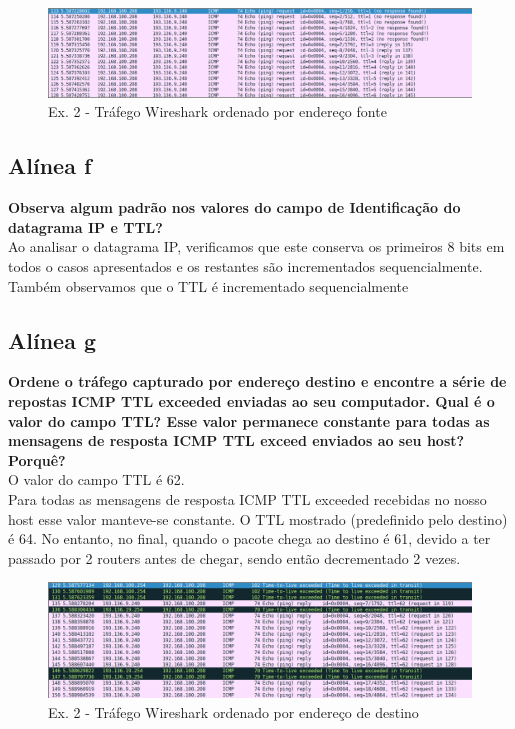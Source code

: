 \documentclass[a4paper]{report}
\begin{document}
\begin{figure}[H]
    \centering 
    \includegraphics[width=\textwidth]{images/wiresharkSourceEx2.png}
    \caption{Ex. 2 - Tráfego Wireshark ordenado por endereço fonte}
    \label{fig:wiresharkSourceEx2}
\end{figure}
\subsection{Alínea f}
\textbf{Observa algum padrão nos valores do campo de Identificação do datagrama
IP e TTL?}\\
Ao analisar o datagrama IP, verificamos que este conserva os primeiros 8 bits
em todos o casos apresentados e os restantes são incrementados
sequencialmente.\\
Também observamos que o TTL é incrementado sequencialmente

\subsection{Alínea g}
\textbf{Ordene o tráfego capturado por endereço destino e encontre a 
série de repostas ICMP TTL exceeded enviadas ao seu computador. Qual é o
valor do campo TTL? Esse valor permanece constante para todas as mensagens 
de resposta ICMP TTL exceed enviados ao seu host? Porquê?}\\
O valor do campo TTL é 62.\\
Para todas as mensagens de resposta ICMP TTL exceeded recebidas no nosso host
esse valor manteve-se constante. O TTL mostrado (predefinido pelo destino) é 64.
No entanto, no final, quando o pacote chega ao destino é 61, devido a ter
passado por 2 routers antes de chegar, sendo então decrementado 2 vezes.

\begin{figure}[H]
    \centering 
    \includegraphics[width=\textwidth]{images/wiresharkDestinyEx2.png}
    \caption{Ex. 2 - Tráfego Wireshark ordenado por endereço de destino}
    \label{fig:wiresharkDestinyEx2}
\end{figure}
\end{document}
